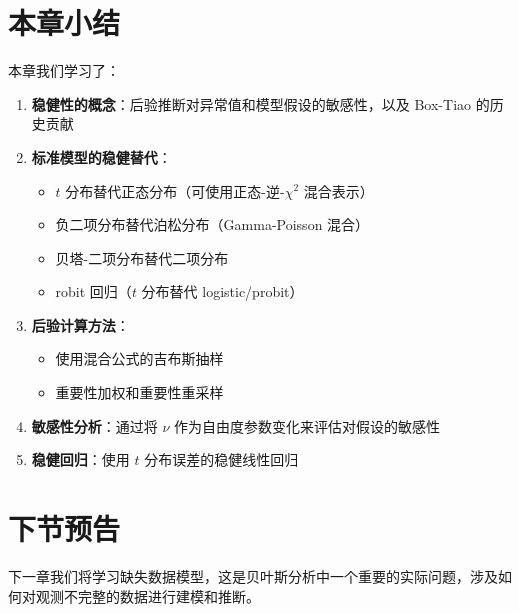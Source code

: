 \section{本章小结}

本章我们学习了：

\begin{enumerate}
  \item \textbf{稳健性的概念}：后验推断对异常值和模型假设的敏感性，以及 Box-Tiao 的历史贡献
  \item \textbf{标准模型的稳健替代}：
  \begin{itemize}
    \item $t$ 分布替代正态分布（可使用正态-逆-$\chi^2$ 混合表示）
    \item 负二项分布替代泊松分布（Gamma-Poisson 混合）
    \item 贝塔-二项分布替代二项分布
    \item robit 回归（$t$ 分布替代 logistic/probit）
  \end{itemize}
  \item \textbf{后验计算方法}：
  \begin{itemize}
    \item 使用混合公式的吉布斯抽样
    \item 重要性加权和重要性重采样
  \end{itemize}
  \item \textbf{敏感性分析}：通过将 $\nu$ 作为自由度参数变化来评估对假设的敏感性
  \item \textbf{稳健回归}：使用 $t$ 分布误差的稳健线性回归
\end{enumerate}

\section{下节预告}

下一章我们将学习缺失数据模型，这是贝叶斯分析中一个重要的实际问题，涉及如何对观测不完整的数据进行建模和推断。

\endinput
